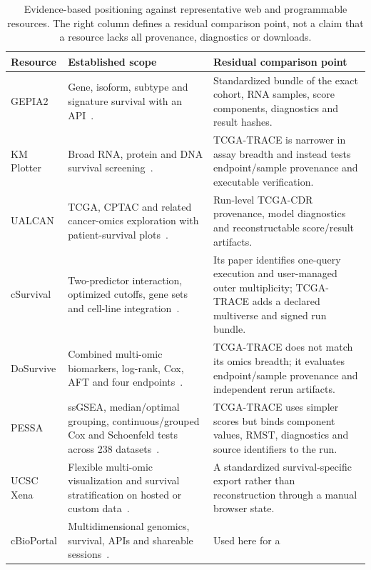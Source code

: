 \documentclass[12pt]{article}
\begin{document}
\begin{table}[H]
\centering
\begingroup
{}
\scriptsize
\setlength{\tabcolsep}{3pt}
\renewcommand{\arraystretch}{0.95}
\caption{Evidence-based positioning against representative web and
programmable resources. The right column defines a residual comparison point,
not a claim that a resource lacks all provenance, diagnostics or downloads.}
\label{tab:supp-comparator-matrix}
\begin{tabularx}{\linewidth}{>{\raggedright\arraybackslash}p{1.9cm}XX}
\toprule
Resource & Established scope & Residual comparison point \\
\midrule
GEPIA2 & Gene, isoform, subtype and signature survival with an
API~\citep{gepia22019}. & Standardized bundle of the exact cohort, RNA samples,
score components, diagnostics and result hashes. \\
KM Plotter & Broad RNA, protein and DNA survival
screening~\citep{kmplotter2021,kmplotterWeb2026}. & TCGA-TRACE is narrower in
assay breadth and instead tests endpoint/sample provenance and executable
verification. \\
UALCAN & TCGA, CPTAC and related cancer-omics exploration with patient-survival
plots~\citep{ualcan2022}. & Run-level TCGA-CDR provenance, model diagnostics and
reconstructable score/result artifacts. \\
cSurvival & Two-predictor interaction, optimized cutoffs, gene sets and
cell-line integration~\citep{csurvival2022}. & Its paper identifies one-query
execution and user-managed outer multiplicity; TCGA-TRACE adds a declared
multiverse and signed run bundle. \\
DoSurvive & Combined multi-omic biomarkers, log-rank, Cox, AFT and four
endpoints~\citep{dousurvive2023}. & TCGA-TRACE does not match its omics breadth;
it evaluates endpoint/sample provenance and independent rerun artifacts. \\
PESSA & ssGSEA, median/optimal grouping, continuous/grouped Cox and Schoenfeld
tests across 238 datasets~\citep{pessa2024}. & TCGA-TRACE uses simpler scores
but binds component values, RMST, diagnostics and source identifiers to the
run. \\
UCSC Xena & Flexible multi-omic visualization and survival stratification on
hosted or custom data~\citep{xena2020,xenaSurvival2026}. & A standardized
survival-specific export rather than reconstruction through a manual browser
state. \\
cBioPortal & Multidimensional genomics, survival, APIs and shareable
sessions~\citep{cbioportal2012,cbioportalApi2026}. & Used here for a

\end{tabularx}
\end{table}
\end{document}
